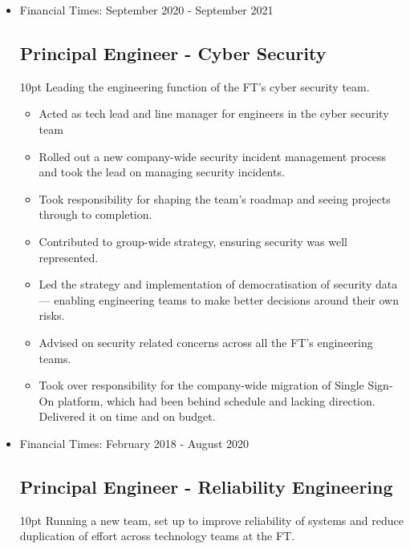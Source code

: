 \documentclass[a4paper]{article}
\newenvironment{detail}{\begin{adjustwidth}{10pt}{}}{\end{adjustwidth}}
\begin{document}
\begin{itemize}
\item Financial Times: September 2020 - September 2021
\subsection*{Principal Engineer - Cyber Security}
\begin{detail}
Leading the engineering function of the FT's cyber security team.

\begin{itemize}
	\item Acted as tech lead and line manager for engineers in the cyber security team
	\item Rolled out a new company-wide security incident management process and took the lead on managing security incidents.
	\item Took responsibility for shaping the team's roadmap and seeing projects through to completion.
	\item Contributed to group-wide strategy, ensuring security was well represented.
	\item Led the strategy and implementation of democratisation of security data — enabling engineering teams to make better decisions around their own risks.
	\item Advised on security related concerns across all the FT's engineering teams.
	\item Took over responsibility for the company-wide migration of Single Sign-On platform, which had been behind schedule and lacking direction.  Delivered it on time and on budget.
\end{itemize}
\end{detail}

\pagebreak

\item Financial Times: February 2018 - August 2020
\subsection*{Principal Engineer - Reliability Engineering}
\begin{detail}
Running a new team, set up to improve reliability of systems and reduce duplication of effort across technology teams at the FT.


\end{detail}
\end{itemize}
\end{document}
